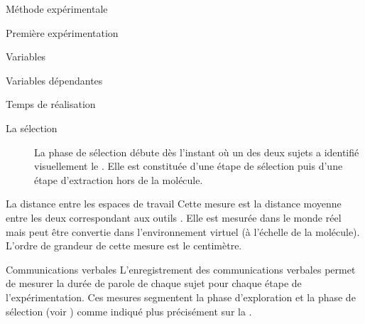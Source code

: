 \documentclass[myfrancais,ngerman,english,frenchb]{mythesis}
\begin{document}
\begin{mychapter}{Méthode expérimentale}
\begin{mysection}{Première expérimentation}
\begin{mysubsection}{Variables}
\begin{mysubsubsection}{Variables dépendantes}
\begin{myparagraph}{ Temps de réalisation}
\begin{description}
							\item[La sélection] La phase de sélection débute dès l'instant où un des deux sujets a identifié visuellement le .
								Elle est constituée d'une étape de sélection puis d'une étape d'extraction hors de la molécule.
						\end{description}
					\end{myparagraph}
					\begin{myparagraph}{ La distance entre les espaces de travail}
						Cette mesure est la distance moyenne entre les deux  correspondant aux outils .
						Elle est mesurée dans le monde réel mais peut être convertie dans l'environnement virtuel (à l'échelle de la molécule).
						L'ordre de grandeur de cette mesure est le centimètre.
					\end{myparagraph}
					\begin{myparagraph}{ Communications verbales}
						L'enregistrement des communications verbales permet de mesurer la durée de parole de chaque sujet pour chaque étape de l'expérimentation.
						Ces mesures segmentent la phase d'exploration et la phase de sélection (voir ) comme indiqué plus précisément sur la .


\end{myparagraph}
\end{mysubsubsection}
\end{mysubsection}
\end{mysection}
\end{mychapter}
\end{document}
